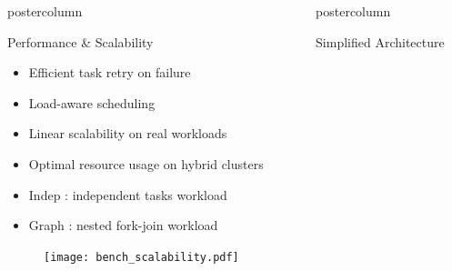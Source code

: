 \begin{frame}[fragile]
\begin{columns}[T]
\begin{column}{.49\textwidth}
\begin{beamercolorbox}[center,wd=\textwidth]{postercolumn}
\begin{minipage}[T]{.96\textwidth}
            \begin{block}{Performance \& Scalability}
            \begin{itemize}
                \item Efficient task retry on failure
                \item Load-aware scheduling
                \item Linear scalability on real workloads
                \item Optimal resource usage on hybrid clusters
                \item Indep : independent tasks workload
                \item Graph : nested fork-join workload
            \end{itemize}
            \begin{figure}
              \centering
              \texttt{[image: bench\_scalability.pdf]}
            \end{figure}
            \end{block}

        \end{minipage}
      \end{beamercolorbox}
    \end{column}
    \begin{column}{.49\textwidth}
      \begin{beamercolorbox}[center,wd=\textwidth]{postercolumn}
        \begin{minipage}[T]{.96\textwidth}
            
            \begin{block}{Simplified Architecture}
            \centering
            
            \end{block}


\end{minipage}
\end{beamercolorbox}
\end{column}
\end{columns}
\end{frame}
